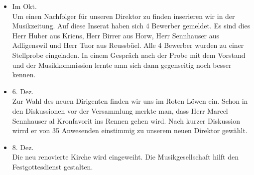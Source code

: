 \begin{history}
\begin{itemize}
        \item Im Okt.\\
              Um einen Nachfolger für unseren Direktor zu finden inserieren wir in der
              Musikzeitung. Auf diese Inserat haben sich 4 Bewerber gemeldet. Es sind
              dies Herr Huber aus Kriens, Herr Birrer aus Horw, Herr Sennhauser aus
              Adligenswil und Herr Tuor aus Reussbüel. Alle 4 Bewerber wurden zu einer
              Stellprobe eingeladen. In einem Gespräch nach der Probe mit dem Vorstand
              und der Musikkommission lernte amn sich dann gegenseitig noch besser
              kennen.

        \item 6. Dez.\\
              Zur Wahl des neuen Dirigenten finden wir uns im Roten Löwen ein. Schon
              in den Diskussionen vor der Versammlung merkte man, dass Herr Marcel
              Sennhauser al Kronfavorit ins Rennen gehen wird. Nach kurzer Diskussion
              wirrd er von 35 Anwesenden einstimmig zu unserem neuen Direktor gewählt.

        \item 8. Dez.\\
              Die neu renovierte Kirche wird eingeweiht. Die Musikgesellschaft hilft
              den Festgottesdienst gestalten.


    \end{itemize}

\end{history}
